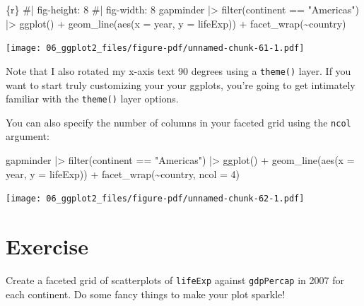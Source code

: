 \documentclass[
  letterpaper,
  DIV=11,
  numbers=noendperiod]{scrreprt}
\newenvironment{Shaded}{\begin{snugshade}}{\end{snugshade}}
\newcommand{\AttributeTok}[1]{\textcolor[rgb]{0.40,0.45,0.13}{#1}}
\newcommand{\DecValTok}[1]{\textcolor[rgb]{0.68,0.00,0.00}{#1}}
\newcommand{\FunctionTok}[1]{\textcolor[rgb]{0.28,0.35,0.67}{#1}}
\newcommand{\InformationTok}[1]{\textcolor[rgb]{0.37,0.37,0.37}{#1}}
\newcommand{\NormalTok}[1]{\textcolor[rgb]{0.00,0.23,0.31}{#1}}
\newcommand{\SpecialCharTok}[1]{\textcolor[rgb]{0.37,0.37,0.37}{#1}}
\newcommand{\StringTok}[1]{\textcolor[rgb]{0.13,0.47,0.30}{#1}}
\begin{document}
\begin{Shaded}
\begin{Highlighting}[]
\InformationTok{\textasciigrave{}\textasciigrave{}\textasciigrave{}\{r\}}
\InformationTok{\#| fig{-}height: 8}
\InformationTok{\#| fig{-}width: 8}
\InformationTok{gapminder |\textgreater{}}
\InformationTok{  filter(continent == "Americas") |\textgreater{}}
\InformationTok{  ggplot() + }
\InformationTok{  geom\_line(aes(x = year, }
\InformationTok{                y = lifeExp)) +}
\InformationTok{  facet\_wrap(\textasciitilde{}country)}
\InformationTok{\textasciigrave{}\textasciigrave{}\textasciigrave{}}
\end{Highlighting}
\end{Shaded}

\texttt{[image: 06\_ggplot2\_files/figure-pdf/unnamed-chunk-61-1.pdf]}

Note that I also rotated my x-axis text 90 degrees using a
\texttt{theme()} layer. If you want to start truly customizing your your
ggplots, you're going to get intimately familiar with the
\texttt{theme()} layer options.

You can also specify the number of columns in your faceted grid using
the \texttt{ncol} argument:

\begin{Shaded}
\begin{Highlighting}[]
\NormalTok{gapminder }\SpecialCharTok{|\textgreater{}}
  \FunctionTok{filter}\NormalTok{(continent }\SpecialCharTok{==} \StringTok{"Americas"}\NormalTok{) }\SpecialCharTok{|\textgreater{}}
  \FunctionTok{ggplot}\NormalTok{() }\SpecialCharTok{+} 
  \FunctionTok{geom\_line}\NormalTok{(}\FunctionTok{aes}\NormalTok{(}\AttributeTok{x =}\NormalTok{ year, }
                \AttributeTok{y =}\NormalTok{ lifeExp)) }\SpecialCharTok{+}
  \FunctionTok{facet\_wrap}\NormalTok{(}\SpecialCharTok{\textasciitilde{}}\NormalTok{country, }\AttributeTok{ncol =} \DecValTok{4}\NormalTok{)}
\end{Highlighting}
\end{Shaded}

\texttt{[image: 06\_ggplot2\_files/figure-pdf/unnamed-chunk-62-1.pdf]}

\section{Exercise}

Create a faceted grid of scatterplots of \texttt{lifeExp} against
\texttt{gdpPercap} in 2007 for each continent. Do some fancy things to
make your plot sparkle!
\end{document}
